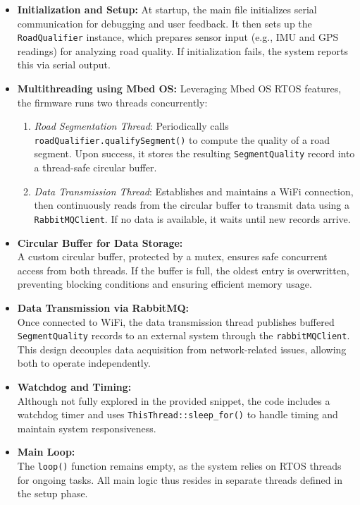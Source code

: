 \begin{itemize}
    \item \textbf{Initialization and Setup:}  
    At startup, the main file initializes serial communication for debugging and user feedback. It then sets up the \texttt{RoadQualifier} instance, which prepares sensor input (e.g., IMU and GPS readings) for analyzing road quality. If initialization fails, the system reports this via serial output.

    \item \textbf{Multithreading using Mbed OS:}  
    Leveraging Mbed OS RTOS features, the firmware runs two threads concurrently:
    \begin{enumerate}
        \item \textit{Road Segmentation Thread}: Periodically calls \texttt{roadQualifier.qualifySegment()} to compute the quality of a road segment. Upon success, it stores the resulting \texttt{SegmentQuality} record into a thread-safe circular buffer.
        \item \textit{Data Transmission Thread}: Establishes and maintains a WiFi connection, then continuously reads from the circular buffer to transmit data using a \texttt{RabbitMQClient}. If no data is available, it waits until new records arrive.
    \end{enumerate}

    \item \textbf{Circular Buffer for Data Storage:}  \\
    A custom circular buffer, protected by a mutex, ensures safe concurrent access from both threads. If the buffer is full, the oldest entry is overwritten, preventing blocking conditions and ensuring efficient memory usage.

    \item \textbf{Data Transmission via RabbitMQ:}  \\
    Once connected to WiFi, the data transmission thread publishes buffered \texttt{SegmentQuality} records to an external system through the \texttt{rabbitMQClient}. This design decouples data acquisition from network-related issues, allowing both to operate independently.

    \item \textbf{Watchdog and Timing:}  \\
    Although not fully explored in the provided snippet, the code includes a watchdog timer and uses \texttt{ThisThread::sleep\_for()} to handle timing and maintain system responsiveness.

    \item \textbf{Main Loop:}  \\
    The \texttt{loop()} function remains empty, as the system relies on RTOS threads for ongoing tasks. All main logic thus resides in separate threads defined in the setup phase.
\end{itemize}

